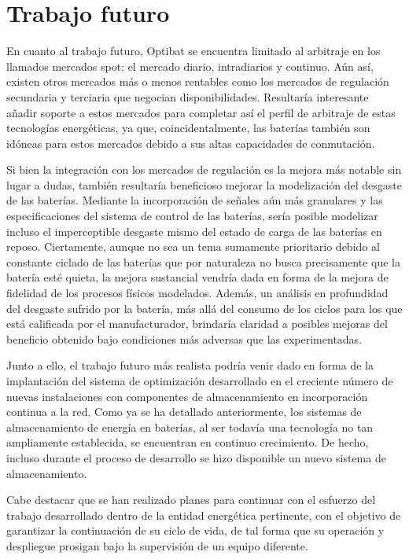 \section{Trabajo futuro}
\label{makereference8.2}

En cuanto al trabajo futuro, Optibat se encuentra limitado al arbitraje en los llamados mercados spot: el mercado diario, intradiarios y continuo. Aún así, existen otros mercados más o menos rentables como los mercados de regulación secundaria y terciaria que negocian disponibilidades. Resultaría interesante añadir soporte a estos mercados para completar así el perfil de arbitraje de estas tecnologías energéticas, ya que, coincidentalmente, las baterías también son idóneas para estos mercados debido a sus altas capacidades de conmutación.

Si bien la integración con los mercados de regulación es la mejora más notable sin lugar a dudas, también resultaría beneficioso mejorar la modelización del desgaste de las baterías. Mediante la incorporación de señales aún más granulares y las especificaciones del sistema de control de las baterías, sería posible modelizar incluso el imperceptible desgaste mismo del estado de carga de las baterías en reposo. Ciertamente, aunque no sea un tema sumamente prioritario debido al constante ciclado de las baterías que por naturaleza no busca precisamente que la batería esté quieta, la mejora sustancial vendría dada en forma de la mejora de fidelidad de los procesos físicos modelados. Además, un análisis en profundidad del desgaste sufrido por la batería, más allá del consumo de los ciclos para los que está calificada por el manufacturador, brindaría claridad a posibles mejoras del beneficio obtenido bajo condiciones más adversas que las experimentadas.

Junto a ello, el trabajo futuro más realista podría venir dado en forma de la implantación del sistema de optimización desarrollado en el creciente número de nuevas instalaciones con componentes de almacenamiento en incorporación continua a la red. Como ya se ha detallado anteriormente, los sistemas de almacenamiento de energía en baterías, al ser todavía una tecnología no tan ampliamente establecida, se encuentran en continuo crecimiento. De hecho, incluso durante el proceso de desarrollo se hizo disponible un nuevo sistema de almacenamiento.

Cabe destacar que se han realizado planes para continuar con el esfuerzo del trabajo desarrollado dentro de la entidad energética pertinente, con el objetivo de garantizar la continuación de su ciclo de vida, de tal forma que su operación y despliegue prosigan bajo la supervisión de un equipo diferente.
